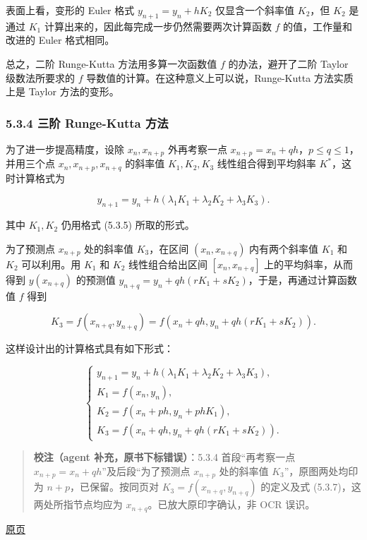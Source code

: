\documentclass[
  10pt,
  fontset=fandol]{ctexart}
\begin{document}
表面上看，变形的 Euler 格式 \(y_{n+1}=y_n+hK_2\) 仅显含一个斜率值 \(K_2\)，但 \(K_2\) 是通过 \(K_1\) 计算出来的，因此每完成一步仍然需要两次计算函数 \(f\) 的值，工作量和改进的 Euler 格式相同。

总之，二阶 Runge-Kutta 方法用多算一次函数值 \(f\) 的办法，避开了二阶 Taylor 级数法所要求的 \(f\) 导数值的计算。在这种意义上可以说，Runge-Kutta 方法实质上是 Taylor 方法的变形。

\subsubsection{5.3.4 三阶 Runge-Kutta 方法}\label{ux4e09ux9636-runge-kutta-ux65b9ux6cd5}

为了进一步提高精度，设除 \(x_n,x_{n+p}\) 外再考察一点 \(x_{n+p}=x_n+qh\)，\(p\leqslant q\leqslant1\)，并用三个点 \(x_n,x_{n+p},x_{n+q}\) 的斜率值 \(K_1,K_2,K_3\) 线性组合得到平均斜率 \(K^*\)，这时计算格式为

\[
y_{n+1}=y_n+h(\lambda_1K_1+\lambda_2K_2+\lambda_3K_3).
\]

其中 \(K_1,K_2\) 仍用格式 (5.3.5) 所取的形式。

为了预测点 \(x_{n+p}\) 处的斜率值 \(K_3\)，在区间 \((x_n,x_{n+q})\) 内有两个斜率值 \(K_1\) 和 \(K_2\) 可以利用。用 \(K_1\) 和 \(K_2\) 线性组合给出区间 \([x_n,x_{n+q}]\) 上的平均斜率，从而得到 \(y(x_{n+q})\) 的预测值 \(y_{n+q}=y_n+qh(rK_1+sK_2)\)，于是，再通过计算函数值 \(f\) 得到

\[
K_3=f(x_{n+q},y_{n+q})=f(x_n+qh,y_n+qh(rK_1+sK_2)).
\]

这样设计出的计算格式具有如下形式：

\[
\begin{cases}
y_{n+1}=y_n+h(\lambda_1K_1+\lambda_2K_2+\lambda_3K_3),\\
K_1=f(x_n,y_n),\\
K_2=f(x_n+ph,y_n+phK_1),\\
K_3=f(x_n+qh,y_n+qh(rK_1+sK_2)).
\end{cases}\tag{5.3.7}
\]

\begin{quote}
\textbf{校注（agent 补充，原书下标错误）}：5.3.4 首段``再考察一点 \(x_{n+p}=x_n+qh\)''及后段``为了预测点 \(x_{n+p}\) 处的斜率值 \(K_3\)''，原图两处均印为 \(n+p\)，已保留。按同页对 \(K_3=f(x_{n+q},y_{n+q})\) 的定义及式 (5.3.7)，这两处所指节点均应为 \(x_{n+q}\)。已放大原印字确认，非 OCR 误识。
\end{quote}

\href{../../source-images/pdf-130.jpeg}{原页}
\end{document}
